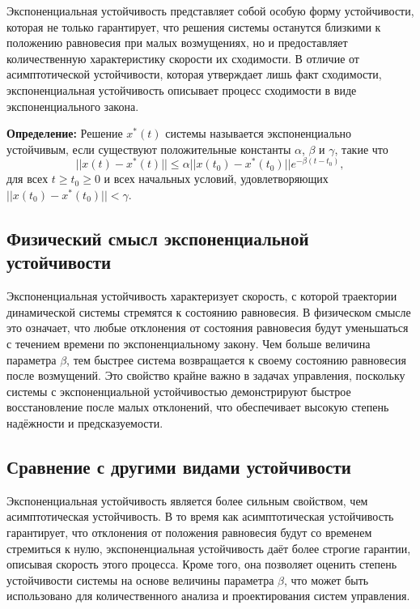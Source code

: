 \documentclass[a4paper,14pt]{extarticle} %
\begin{document}
Экспоненциальная устойчивость представляет собой особую форму устойчивости, которая не только гарантирует, что решения системы останутся близкими к положению равновесия при малых возмущениях, но и предоставляет количественную характеристику скорости их сходимости. В отличие от асимптотической устойчивости, которая утверждает лишь факт сходимости, экспоненциальная устойчивость описывает процесс сходимости в виде экспоненциального закона.

\textbf{Определение:} Решение \(x^*(t)\) системы называется экспоненциально устойчивым, если существуют положительные константы \(\alpha\), \(\beta\) и \(\gamma\), такие что
\[
||x(t) - x^*(t)|| \leq \alpha ||x(t_0) - x^*(t_0)|| e^{-\beta(t - t_0)},
\]
для всех \(t \geq t_0 \geq 0\) и всех начальных условий, удовлетворяющих \(||x(t_0) - x^*(t_0)|| < \gamma\).

\subsection{Физический смысл экспоненциальной устойчивости}

Экспоненциальная устойчивость характеризует скорость, с которой траектории динамической системы стремятся к состоянию равновесия. В физическом смысле это означает, что любые отклонения от состояния равновесия будут уменьшаться с течением времени по экспоненциальному закону. Чем больше величина параметра \(\beta\), тем быстрее система возвращается к своему состоянию равновесия после возмущений. Это свойство крайне важно в задачах управления, поскольку системы с экспоненциальной устойчивостью демонстрируют быстрое восстановление после малых отклонений, что обеспечивает высокую степень надёжности и предсказуемости.

\subsection{Сравнение с другими видами устойчивости}

Экспоненциальная устойчивость является более сильным свойством, чем асимптотическая устойчивость. В то время как асимптотическая устойчивость гарантирует, что отклонения от положения равновесия будут со временем стремиться к нулю, экспоненциальная устойчивость даёт более строгие гарантии, описывая скорость этого процесса. Кроме того, она позволяет оценить степень устойчивости системы на основе величины параметра \(\beta\), что может быть использовано для количественного анализа и проектирования систем управления.
\end{document}
